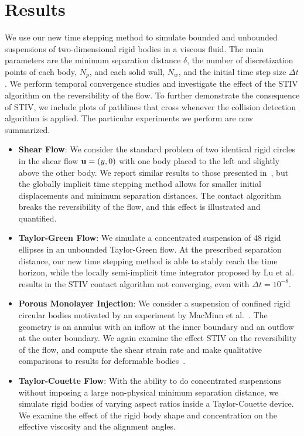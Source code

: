 \documentclass[AMA,STIX1COL]{WileyNJD-v2}
\begin{document}
\section{Results}\label{s:results}
We use our new time stepping method to simulate bounded and unbounded
suspensions of two-dimensional rigid bodies in a viscous fluid.  The
main parameters are the minimum separation distance $\delta$, the number
of discretization points of each body, $N_p$, and each solid wall,
$N_w$, and the initial time step size $\Delta t$. We perform temporal
convergence studies and investigate the effect of the STIV algorithm on
the reversibility of the flow.  To further demonstrate the consequence
of STIV, we include plots of pathlines that cross whenever the collision
detection algorithm is applied.  The particular experiments we perform
are now summarized.
\begin{itemize}
  \item {\bf Shear Flow}: We consider the standard problem of two
  identical rigid circles in the shear flow ${\mathbf{u}} = (y,0)$ with one body
  placed to the left and slightly above the other body.  We report
  similar results to those presented in~\cite{Lu2017}, but the globally
  implicit time stepping method allows for smaller initial displacements
  and minimum separation distances.  The contact algorithm breaks the
  reversibility of the flow, and this effect is illustrated and
  quantified.

  \item {\bf Taylor-Green Flow}: We simulate a concentrated suspension
  of 48 rigid ellipses in an unbounded Taylor-Green flow. At the
  prescribed separation distance, our new time stepping method is able
  to stably reach the time horizon, while the locally semi-implicit time
  integrator proposed by Lu et al.~\cite{Lu2017} results in the STIV
  contact algorithm not converging, even with $\Delta t = 10^{-8}$.

  \item {\bf Porous Monolayer Injection}: We consider a suspension of
  confined rigid circular bodies motivated by an experiment by MacMinn
  et al.~\cite{MacMinn2015}.  The geometry is an annulus with an inflow
  at the inner boundary and an outflow at the outer boundary.  We again
  examine the effect STIV on the reversibility of the flow, and compute
  the shear strain rate and make qualitative comparisons to results for
  deformable bodies~\cite{MacMinn2015}.

  \item {\bf Taylor-Couette Flow}: With the ability to do concentrated
  suspensions without imposing a large non-physical minimum separation
  distance, we simulate rigid bodies of varying aspect ratios inside a
  Taylor-Couette device.  We examine the effect of the rigid body shape
  and concentration on the effective viscosity and the alignment angles.
\end{itemize}
\end{document}
